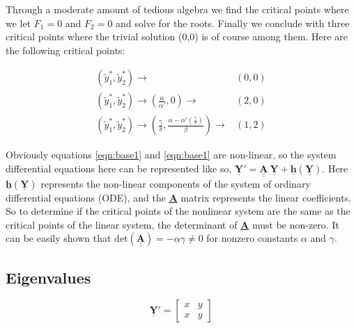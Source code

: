 \documentclass{article}
\def\doubleunderline#1{\underline{\underline{#1}}}
\begin{document}
Through a moderate amount of tedious algebra we find the critical points where we let $F_1=0$ and $F_2=0$ and solve for the roots. Finally we conclude with three critical points where the trivial solution (0,0) is of course among them. Here are the following critical points: 
\\
\begin{mybox}[standard jigsaw, opacityback=0, title=critical points, colframe=black!30!black]
\begin{align}
(\tilde{y}_1^*, \tilde{y}_2^*) \rightarrow &(0,0) \\[6pt]
(\tilde{y}_1^*, \tilde{y}_2^*) \rightarrow (\frac{\alpha}{\alpha'}, 0) \rightarrow &(2,0) \\[6pt]
(\tilde{y}_1^*, \tilde{y}_2^*) \rightarrow (\frac{\gamma}{\delta}, \frac{\alpha - \alpha'\left(\frac{\gamma}{\delta}\right)}{\beta}) \rightarrow &(1,2)
\end{align}
\end{mybox}

Obviously equations \eqref{eqn:base1} and \eqref{eqn:base1} are non-linear, so the system differential equations here can be represented like so, $\underline{\textbf{Y}}'=\doubleunderline{\textbf{A}}\ \underline{\textbf{Y}}+ \underline{\textbf{h}}(\underline{\textbf{Y}})$. Here $\underline{\textbf{h}}(\underline{\textbf{Y}})$ represents the non-linear components of the system of ordinary differential equations (ODE), and the \doubleunderline{\textbf{A}} matrix represents the linear coefficients. So to determine if the critical points of the nonlinear system are the same as the critical points of the linear system, the determinant of \doubleunderline{\textbf{A}} must be non-zero. It can be easily shown that $\text{det}(\doubleunderline{\textbf{A}}) = -\alpha\gamma\neq 0$ for nonzero constants $\alpha$ and $\gamma$.


\subsection{Eigenvalues}
\[
\underline{\textbf{Y}}' = 
  \begin{bmatrix}
  x & y\\
  x & y
  \end{bmatrix}
\]
\end{document}

